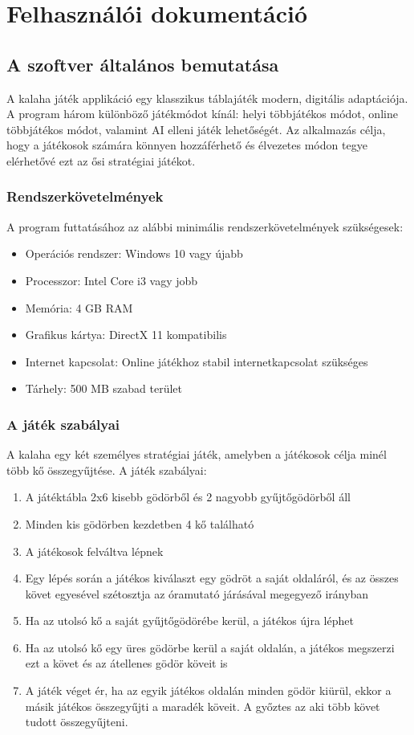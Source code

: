 \chapter{Felhasználói dokumentáció}
\label{ch:user}

\section{A szoftver általános bemutatása}

A kalaha játék applikáció egy klasszikus táblajáték modern, digitális adaptációja. A program három különböző játékmódot kínál: helyi többjátékos módot, online többjátékos módot, valamint AI elleni játék lehetőségét. Az alkalmazás célja, hogy a játékosok számára könnyen hozzáférhető és élvezetes módon tegye elérhetővé ezt az ősi stratégiai játékot.

\subsection{Rendszerkövetelmények}
A program futtatásához az alábbi minimális rendszerkövetelmények szükségesek:
\begin{itemize}
	\item Operációs rendszer: Windows 10 vagy újabb
	\item Processzor: Intel Core i3 vagy jobb
	\item Memória: 4 GB RAM
	\item Grafikus kártya: DirectX 11 kompatibilis
	\item Internet kapcsolat: Online játékhoz stabil internetkapcsolat szükséges
	\item Tárhely: 500 MB szabad terület
\end{itemize}

\subsection{A játék szabályai}
A kalaha egy két személyes stratégiai játék, amelyben a játékosok célja minél több kő összegyűjtése. A játék szabályai:

\begin{enumerate}
	\item A játéktábla 2x6 kisebb gödörből és 2 nagyobb gyűjtőgödörből áll
	\item Minden kis gödörben kezdetben 4 kő található
	\item A játékosok felváltva lépnek
	\item Egy lépés során a játékos kiválaszt egy gödröt a saját oldaláról, és az összes követ egyesével szétosztja az óramutató járásával megegyező irányban
	\item Ha az utolsó kő a saját gyűjtőgödörébe kerül, a játékos újra léphet
	\item Ha az utolsó kő egy üres gödörbe kerül a saját oldalán, a játékos megszerzi ezt a követ és az átellenes gödör köveit is
	\item A játék véget ér, ha az egyik játékos oldalán minden gödör kiürül, ekkor a másik játékos összegyűjti a maradék köveit. A győztes az aki több követ tudott összegyűjteni.
\end{enumerate}

